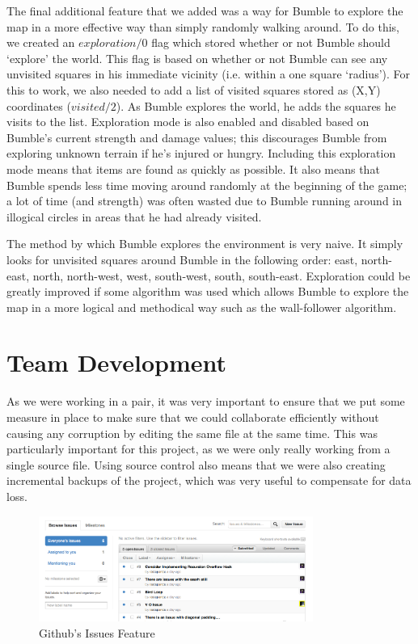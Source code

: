 \documentclass[a4paper,oneside]{report}
\begin{document}
The final additional feature that we added was a way for Bumble to explore the map in a more effective way than simply randomly walking around. To do this, we created an $exploration/0$ flag which stored whether or not Bumble should `explore' the world. This flag is based on whether or not Bumble can see any unvisited squares in his immediate vicinity (i.e. within a one square `radius'). For this to work, we also needed to add a list of visited squares stored as (X,Y) coordinates ($visited/2$). As Bumble explores the world, he adds the squares he visits to the list. Exploration mode is also enabled and disabled based on Bumble's current strength and damage values; this discourages Bumble from exploring unknown terrain if he's injured or hungry. Including this exploration mode means that items are found as quickly as possible. It also means that Bumble spends less time moving around randomly at the beginning of the game; a lot of time (and strength) was often wasted due to Bumble running around in illogical circles in areas that he had already visited.

The method by which Bumble explores the environment is very naive. It simply looks for unvisited squares around Bumble in the following order: east, north-east, north, north-west, west, south-west, south, south-east. Exploration could be greatly improved if some algorithm was used which allows Bumble to explore the map in a more logical and methodical way such as the wall-follower algorithm.

\section{Team Development}
	
As we were working in a pair, it was very important to ensure that we put some measure in place to make sure that we could collaborate efficiently without causing any corruption by editing the same file at the same time. This was particularly important for this project, as we were only really working from a single source file. Using source control also means that we were also creating incremental backups of the project, which was very useful to compensate for data loss.

\begin{figure}[h!]
  \centering
	\includegraphics[width=0.8\textwidth]{issues.png}
	\caption{Github's Issues Feature}
\end{figure}
\end{document}
